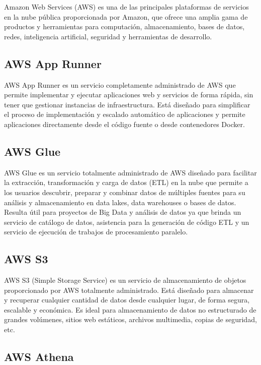 Amazon Web Services (AWS) es una de las principales plataformas de servicios en la nube pública proporcionada por Amazon, que ofrece una amplia gama de productos y herramientas para computación, almacenamiento, bases de datos, redes, inteligencia artificial, seguridad y herramientas de desarrollo.


\subsection{AWS App Runner}

AWS App Runner es un servicio completamente administrado de AWS que permite implementar y ejecutar aplicaciones web y servicios de forma rápida, sin tener que gestionar instancias de infraestructura. Está diseñado para simplificar el proceso de implementación y escalado automático de aplicaciones y permite aplicaciones directamente desde el código fuente o desde contenedores Docker.



\subsection{AWS Glue}

AWS Glue es un servicio totalmente administrado de AWS diseñado para facilitar la extracción, transformación y carga de datos (ETL) en la nube que permite a los usuarios descubrir, preparar y combinar datos de múltiples fuentes para su análisis y almacenamiento en data lakes, data warehouses o bases de datos. Resulta útil para proyectos de Big Data y análisis de datos ya que brinda un servicio de catálogo de datos, asistencia para la generación de código ETL y un servicio de ejecución de trabajos de procesamiento paralelo.


\subsection{AWS S3}

AWS S3 (Simple Storage Service) es un servicio de almacenamiento de objetos proporcionado por AWS totalmente administrado. Está diseñado para almacenar y recuperar cualquier cantidad de datos desde cualquier lugar, de forma segura, escalable y económica. Es ideal para almacenamiento de datos no estructurado de grandes volúmenes, sitios web estáticos, archivos multimedia, copias de seguridad, etc.

\subsection{AWS Athena}

